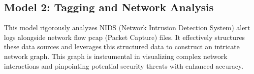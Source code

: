 



\subsection{Model 2: Tagging and Network Analysis}
This model rigorously analyzes NIDS (Network Intrusion Detection System) alert logs alongside network flow pcap (Packet Capture) files. It effectively structures these data sources and leverages this structured data to construct an intricate network graph. This graph is instrumental in visualizing complex network interactions and pinpointing potential security threats with enhanced accuracy.


